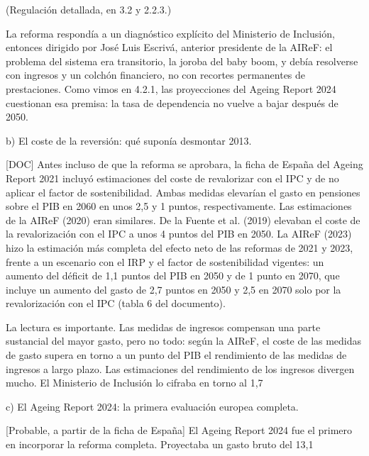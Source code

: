 \documentclass[10pt,a4paper]{article}
\begin{document}
(Regulación detallada, en 3.2 y 2.2.3.)

La reforma respondía a un diagnóstico explícito del Ministerio de Inclusión, entonces dirigido por José Luis Escrivá, anterior presidente de la AIReF: el problema del sistema era transitorio, la joroba del baby boom, y debía resolverse con ingresos y un colchón financiero, no con recortes permanentes de prestaciones. Como vimos en 4.2.1, las proyecciones del Ageing Report 2024 cuestionan esa premisa: la tasa de dependencia no vuelve a bajar después de 2050.

b) El coste de la reversión: qué suponía desmontar 2013.

[DOC] Antes incluso de que la reforma se aprobara, la ficha de España del Ageing Report 2021 incluyó estimaciones del coste de revalorizar con el IPC y de no aplicar el factor de sostenibilidad. Ambas medidas elevarían el gasto en pensiones sobre el PIB en 2060 en unos 2,5 y 1 puntos, respectivamente. Las estimaciones de la AIReF (2020) eran similares. De la Fuente et al. (2019) elevaban el coste de la revalorización con el IPC a unos 4 puntos del PIB en 2050. La AIReF (2023) hizo la estimación más completa del efecto neto de las reformas de 2021 y 2023, frente a un escenario con el IRP y el factor de sostenibilidad vigentes: un aumento del déficit de 1,1 puntos del PIB en 2050 y de 1 punto en 2070, que incluye un aumento del gasto de 2,7 puntos en 2050 y 2,5 en 2070 solo por la revalorización con el IPC (tabla 6 del documento).

La lectura es importante. Las medidas de ingresos compensan una parte sustancial del mayor gasto, pero no todo: según la AIReF, el coste de las medidas de gasto supera en torno a un punto del PIB el rendimiento de las medidas de ingresos a largo plazo. Las estimaciones del rendimiento de los ingresos divergen mucho. El Ministerio de Inclusión lo cifraba en torno al 1,7%

c) El Ageing Report 2024: la primera evaluación europea completa.

[Probable, a partir de la ficha de España] El Ageing Report 2024 fue el primero en incorporar la reforma completa. Proyectaba un gasto bruto del 13,1%
\end{document}
